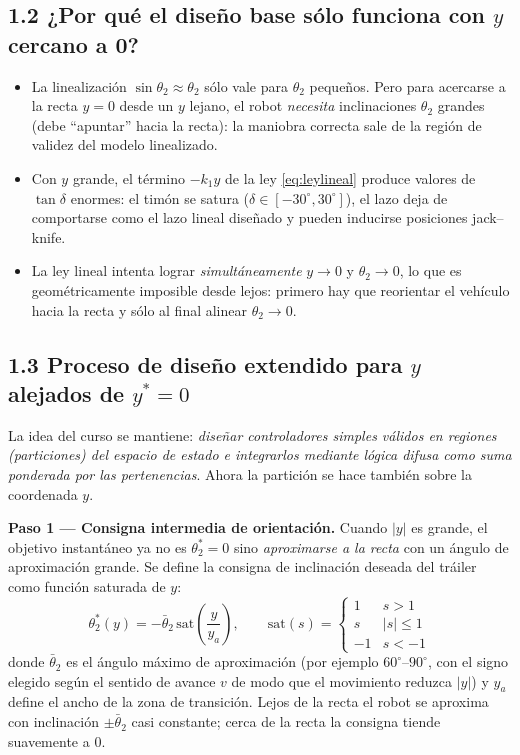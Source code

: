 \documentclass[11pt,a4paper]{article}
\newcommand{\grados}{^{\circ}}
\begin{document}
\subsection*{1.2 ¿Por qué el diseño base sólo funciona con $y$ cercano a 0?}

\begin{itemize}[itemsep=2pt]
\item La linealización $\sin\theta_2\approx\theta_2$ sólo vale para $\theta_2$ pequeños. Pero para acercarse a la recta $y=0$ desde un $y$ lejano, el robot \emph{necesita} inclinaciones $\theta_2$ grandes (debe ``apuntar'' hacia la recta): la maniobra correcta sale de la región de validez del modelo linealizado.
\item Con $y$ grande, el término $-k_1 y$ de la ley \eqref{eq:leylineal} produce valores de $\tan\delta$ enormes: el timón se satura ($\delta\in[-30\grados,30\grados]$), el lazo deja de comportarse como el lazo lineal diseñado y pueden inducirse posiciones jack--knife.
\item La ley lineal intenta lograr \emph{simultáneamente} $y\to 0$ y $\theta_2\to 0$, lo que es geométricamente imposible desde lejos: primero hay que reorientar el vehículo hacia la recta y sólo al final alinear $\theta_2\to 0$.
\end{itemize}

\subsection*{1.3 Proceso de diseño extendido para $y$ alejados de $y^{*}=0$}

La idea del curso se mantiene: \emph{diseñar controladores simples válidos en regiones (particiones) del espacio de estado e integrarlos mediante lógica difusa como suma ponderada por las pertenencias}. Ahora la partición se hace también sobre la coordenada $y$.

\textbf{Paso 1 — Consigna intermedia de orientación.} Cuando $|y|$ es grande, el objetivo instantáneo ya no es $\theta_2^{*}=0$ sino \emph{aproximarse a la recta} con un ángulo de aproximación grande. Se define la consigna de inclinación deseada del tráiler como función saturada de $y$:
\begin{equation}
\theta_2^{*}(y) = -\bar{\theta}_2\,\mathrm{sat}\!\left(\frac{y}{y_a}\right),
\qquad
\mathrm{sat}(s)=\begin{cases} 1 & s>1\\ s & |s|\le 1\\ -1 & s<-1\end{cases}
\label{eq:consigna}
\end{equation}
donde $\bar{\theta}_2$ es el ángulo máximo de aproximación (por ejemplo $60\grados$--$90\grados$, con el signo elegido según el sentido de avance $v$ de modo que el movimiento reduzca $|y|$) y $y_a$ define el ancho de la zona de transición. Lejos de la recta el robot se aproxima con inclinación $\pm\bar\theta_2$ casi constante; cerca de la recta la consigna tiende suavemente a $0$.
\end{document}
